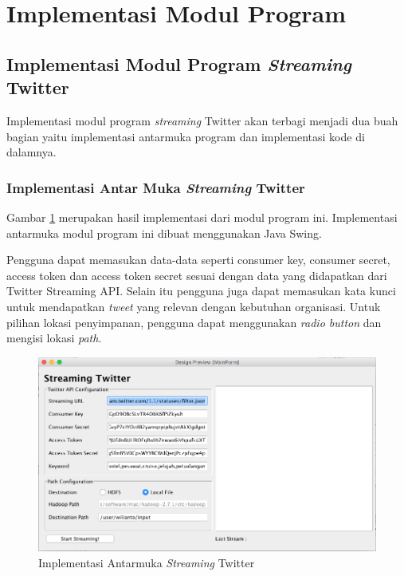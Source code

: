 \section{Implementasi Modul Program}
\subsection{Implementasi Modul Program \textit{Streaming} Twitter}
Implementasi modul program \textit{streaming} Twitter akan terbagi menjadi dua buah bagian yaitu implementasi antarmuka program dan implementasi kode di dalamnya. 

\subsubsection{Implementasi Antar Muka \textit{Streaming} Twitter}
Gambar \ref{fig:ui_implementasi_streaming_twitter} merupakan hasil implementasi dari modul program ini. Implementasi antarmuka modul program ini dibuat menggunakan Java Swing. 

Pengguna dapat memasukan data-data seperti consumer key, consumer secret, access token dan access token secret sesuai dengan data yang didapatkan dari Twitter Streaming API. Selain itu pengguna juga dapat memasukan kata kunci untuk mendapatkan \textit{tweet} yang relevan dengan kebutuhan organisasi. Untuk pilihan lokasi penyimpanan, pengguna dapat menggunakan \textit{radio button} dan mengisi lokasi \textit{path}.
 
\begin{figure}[H]
	\centering
	\includegraphics[scale=0.5]{Gambar/ui-implementasi-streaming-twitter.png}
	\caption[Implementasi Antarmuka \textit{Streaming} Twitterr]{Implementasi Antarmuka \textit{Streaming} Twitter} 
	\label{fig:ui_implementasi_streaming_twitter}
\end{figure}


